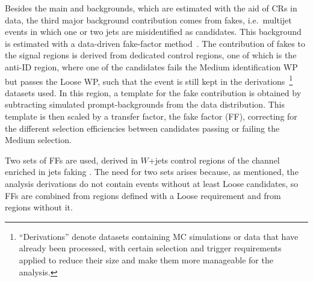 Besides the main \ztautau and \ttbar backgrounds, which are estimated with the aid of CRs in data, the third major background contribution comes from fakes, i.e.\ multijet events in which one or two jets are misidentified as \tauhadvis candidates. 
This background is estimated with a data-driven fake-factor method~\cite{fakes_paper}. 
The contribution of fakes to the signal regions is derived from dedicated control regions, one of which is the anti-ID region, where one of the \tauhad candidates fails the Medium identification WP but passes the Loose WP, such that the event is still kept in the derivations~\footnote{``Derivations'' denote datasets containing MC simulations or data that have already been processed, with certain selection and trigger requirements applied to reduce their size and make them more manageable for the analysis.} datasets used. 
In this region, a template for the fake contribution is obtained by subtracting simulated prompt-\tauhadvis backgrounds from the data distribution. 
This template is then scaled by a transfer factor, the fake factor (FF), correcting for the different selection efficiencies between \tauhadvis candidates passing or failing the Medium selection.

Two sets of FFs are used, derived in $W$+jets control regions of the \taulephad channel enriched in jets faking \tauhadvis.
The need for two sets arises because, as mentioned, the analysis derivations do not contain events without at least Loose \tauhadvis candidates, so FFs are combined from regions defined with a Loose requirement and from regions without it.

